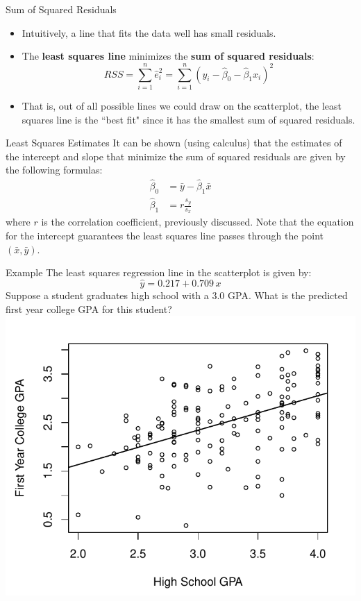\documentclass[11pt, fleqn]{beamer}\usepackage[]{graphicx}\usepackage[]{color}
\begin{document}
\begin{frame}{Sum of Squared Residuals}
\begin{itemize}
\item Intuitively, a line that fits the data well has small residuals.
\vspace{5pt}
\item The \textbf{least squares line} minimizes the \textbf{sum of squared residuals}:
$$RSS = \sum_{i=1}^n \hat{e}_i^2 = \sum_{i=1}^n (y_i - \hat{\beta}_0 - \hat{\beta}_1 x_i)^2$$
\vspace{5pt}
\item That is, out of all possible lines we could draw on the scatterplot, the least squares line is the ``best fit" since it has the smallest sum of squared residuals.
\end{itemize}
\vspace{1.5cm}
\end{frame}

\begin{frame}{Least Squares Estimates}
It can be shown (using calculus) that the estimates of the intercept and slope that minimize the sum of squared residuals are given by the following formulas:
\begin{align*}
\hat{\beta}_0 &= \bar{y} - \hat{\beta}_1 \bar{x}\\
\hat{\beta}_1 &= r \frac{s_y}{s_x}
\end{align*}
where $r$ is the correlation coefficient, previously discussed.  Note that the equation for the intercept guarantees the least squares line passes through the point $(\bar{x}, \bar{y})$.
\end{frame}

\begin{frame}{Example}
\vspace{-0.5cm}
The least squares regression line in the scatterplot is given by:
$$\hat{y} = 0.217 + 0.709\,x$$
Suppose a student graduates high school with a 3.0 GPA.  What is the predicted first year college GPA for this student?
\includegraphics[scale=0.4]{figure/gpa_scatter_line.pdf}
\end{frame}
\end{document}
